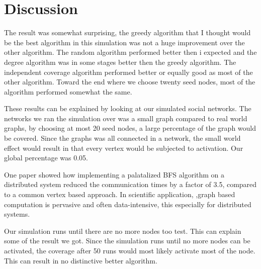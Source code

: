 \chapter{Discussion}
The result was somewhat surprising, the greedy algorithm that I thought would be the best algorithm in this simulation was not a huge improvement over the other algorithm. The random algorithm performed better then i expected and the degree algorithm was in some stages better then the greedy algorithm. The independent coverage algorithm performed better or equally good as most of the other algorithm. Toward the end where we choose twenty seed nodes, most of the algorithm performed somewhat the same.

These results can be explained by looking at our simulated social networks. The networks we ran the simulation over was a small graph compared to real world graphs, by choosing at most 20 seed nodes, a large percentage of the graph would be covered. Since the graphs was all connected in a network, the small world effect would result in that every vertex would be subjected to activation. Our global percentage was 0.05. 

One paper showed how implementing a palatalized BFS algorithm on a distributed system reduced the communication times by a factor of 3.5, compared to a common vertex based approach\cite{ParallelBFS2011}.  In scientific application, ,graph based computation is pervasive and often data-intensive, this especially for distributed systems. 

Our simulation runs until there are no more nodes too test. This can explain some of the result we got. Since the simulation runs until no more nodes can be activated, the coverage after 50 runs would most likely activate most of the node. This can result in no distinctive better algorithm. 

